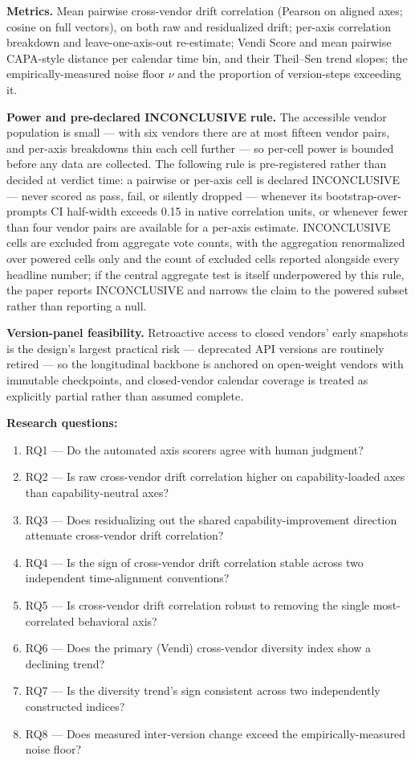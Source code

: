 \documentclass[11pt]{article}
\begin{document}
\textbf{Metrics.} Mean pairwise cross-vendor drift correlation (Pearson on aligned axes; cosine on full vectors), on both raw and residualized drift; per-axis correlation breakdown and leave-one-axis-out re-estimate; Vendi Score and mean pairwise CAPA-style distance per calendar time bin, and their Theil--Sen trend slopes; the empirically-measured noise floor $\nu$ and the proportion of version-steps exceeding it.

\textbf{Power and pre-declared INCONCLUSIVE rule.} The accessible vendor population is small --- with six vendors there are at most fifteen vendor pairs, and per-axis breakdowns thin each cell further --- so per-cell power is bounded before any data are collected. The following rule is pre-registered rather than decided at verdict time: a pairwise or per-axis cell is declared INCONCLUSIVE --- never scored as pass, fail, or silently dropped --- whenever its bootstrap-over-prompts CI half-width exceeds 0.15 in native correlation units, or whenever fewer than four vendor pairs are available for a per-axis estimate. INCONCLUSIVE cells are excluded from aggregate vote counts, with the aggregation renormalized over powered cells only and the count of excluded cells reported alongside every headline number; if the central aggregate test is itself underpowered by this rule, the paper reports INCONCLUSIVE and narrows the claim to the powered subset rather than reporting a null.

\textbf{Version-panel feasibility.} Retroactive access to closed vendors' early snapshots is the design's largest practical risk --- deprecated API versions are routinely retired --- so the longitudinal backbone is anchored on open-weight vendors with immutable checkpoints, and closed-vendor calendar coverage is treated as explicitly partial rather than assumed complete.

\textbf{Research questions:}
\begin{enumerate}[leftmargin=1.6em]
\item RQ1 --- Do the automated axis scorers agree with human judgment?
\item RQ2 --- Is raw cross-vendor drift correlation higher on capability-loaded axes than capability-neutral axes?
\item RQ3 --- Does residualizing out the shared capability-improvement direction attenuate cross-vendor drift correlation?
\item RQ4 --- Is the sign of cross-vendor drift correlation stable across two independent time-alignment conventions?
\item RQ5 --- Is cross-vendor drift correlation robust to removing the single most-correlated behavioral axis?
\item RQ6 --- Does the primary (Vendi) cross-vendor diversity index show a declining trend?
\item RQ7 --- Is the diversity trend's sign consistent across two independently constructed indices?
\item RQ8 --- Does measured inter-version change exceed the empirically-measured noise floor?
\end{enumerate}
\end{document}

